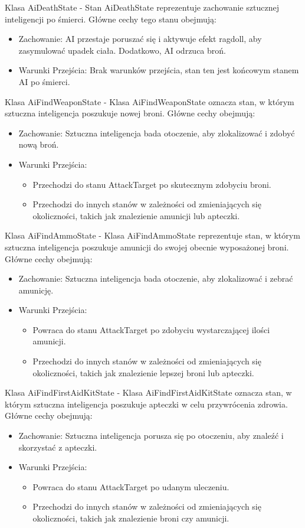 Klasa AiDeathState -
Stan AiDeathState reprezentuje zachowanie sztucznej inteligencji po śmierci. Główne cechy tego stanu obejmują:
\begin{itemize}
  \item Zachowanie: AI przestaje poruszać się i aktywuje efekt ragdoll, aby zasymulować upadek ciała. Dodatkowo, AI odrzuca broń.
  \item Warunki Przejścia: Brak warunków przejścia, stan ten jest końcowym stanem AI po śmierci.
\end{itemize}

Klasa AiFindWeaponState -
Klasa AiFindWeaponState oznacza stan, w którym sztuczna inteligencja poszukuje nowej broni. Główne cechy obejmują:
\begin{itemize}
  \item Zachowanie: Sztuczna inteligencja bada otoczenie, aby zlokalizować i zdobyć nową broń.
  \item Warunki Przejścia:
    \begin{itemize}
      \item Przechodzi do stanu AttackTarget po skutecznym zdobyciu broni.
      \item Przechodzi do innych stanów w zależności od zmieniających się okoliczności, takich jak znalezienie amunicji lub apteczki.
    \end{itemize}
\end{itemize}

Klasa AiFindAmmoState -
Klasa AiFindAmmoState reprezentuje stan, w którym sztuczna inteligencja poszukuje amunicji do swojej obecnie wyposażonej broni. Główne cechy obejmują:
\begin{itemize}
  \item Zachowanie: Sztuczna inteligencja bada otoczenie, aby zlokalizować i zebrać amunicję.
  \item Warunki Przejścia:
    \begin{itemize}
      \item Powraca do stanu AttackTarget po zdobyciu wystarczającej ilości amunicji.
      \item Przechodzi do innych stanów w zależności od zmieniających się okoliczności, takich jak znalezienie lepszej broni lub apteczki.
    \end{itemize}
\end{itemize}

Klasa AiFindFirstAidKitState -
Klasa AiFindFirstAidKitState oznacza stan, w którym sztuczna inteligencja poszukuje apteczki w celu przywrócenia zdrowia. Główne cechy obejmują:
\begin{itemize}
  \item Zachowanie: Sztuczna inteligencja porusza się po otoczeniu, aby znaleźć i skorzystać z apteczki.
  \item Warunki Przejścia:
    \begin{itemize}
      \item Powraca do stanu AttackTarget po udanym uleczeniu.
      \item Przechodzi do innych stanów w zależności od zmieniających się okoliczności, takich jak znalezienie broni czy amunicji.
    \end{itemize}
\end{itemize}

